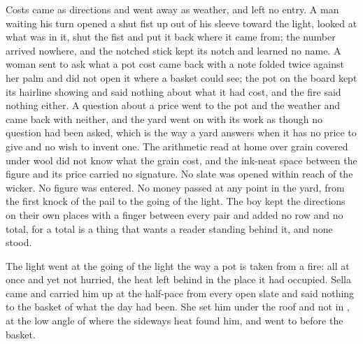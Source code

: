 Costs came as directions and went away as weather, and left no entry. A man waiting his turn opened a shut fist up out of his sleeve toward the light, looked at what was in it, shut the fist and put it back where it came from; the number arrived nowhere, and the notched stick kept its notch and learned no name. A woman sent to ask what a pot cost came back with a note folded twice against her palm and did not open it where a basket could see; the pot on the board kept its hairline showing and said nothing about what it had cost, and the fire said nothing either. A question about a price went to the pot and the weather and came back with neither, and the yard went on with its work as though no question had been asked, which is the way a yard answers when it has no price to give and no wish to invent one. The arithmetic read at home over grain covered under wool did not know what the grain cost, and the ink-neat space between the figure and its price carried no signature. No slate was opened within reach of the wicker. No figure was entered. No money passed at any point in the yard, from the first knock of the pail to the going of the light. The boy kept the directions on their own places with a finger between every pair and added no row and no total, for a total is a thing that wants a reader standing behind it, and none stood.

\scenebreak

The light went at the going of the light the way a pot is taken from a fire: all at once and yet not hurried, the heat left behind in the place it had occupied. Sella came and carried him up at the half-pace from every open slate and said nothing to the basket of what the day had been. She set him under the roof and not in , at the low angle of  where the sideways heat found him, and went to  before the basket.

